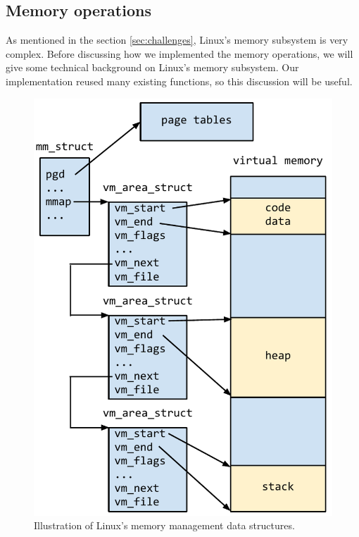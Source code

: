 \begin{itemize}
\subsection{Memory operations}

\label{sec:memop}

As mentioned in the section \ref{sec:challenges}, Linux's memory subsystem is
very complex. Before discussing how we implemented the memory operations,
we will give some technical background on Linux's memory subsystem. Our
implementation reused many existing functions, so this discussion will be
useful.

\begin{figure}[t]
\includegraphics[scale=.63]{mm_struct.pdf}
\caption{Illustration of Linux's memory management data structures.}
\label{fig:mmstruct}
\end{figure}


\end{itemize}
